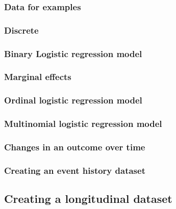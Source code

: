 \documentclass[
  letterpaper,
  DIV=11,
  numbers=noendperiod]{scrreprt}
\begin{document}
\hypertarget{data-for-examples}{%
\subsubsection{Data for examples}\label{data-for-examples}}

\hypertarget{discrete}{%
\subsubsection{Discrete}\label{discrete}}

\hypertarget{binary-logistic-regression-model}{%
\subsubsection{Binary Logistic regression
model}\label{binary-logistic-regression-model}}

\hypertarget{marginal-effects}{%
\subsubsection{Marginal effects}\label{marginal-effects}}

\hypertarget{ordinal-logistic-regression-model}{%
\subsubsection{Ordinal logistic regression
model}\label{ordinal-logistic-regression-model}}

\hypertarget{multinomial-logistic-regression-model}{%
\subsubsection{Multinomial logistic regression
model}\label{multinomial-logistic-regression-model}}

\hypertarget{changes-in-an-outcome-over-time}{%
\subsubsection{Changes in an outcome over
time}\label{changes-in-an-outcome-over-time}}

\hypertarget{creating-an-event-history-dataset}{%
\subsubsection{Creating an event history
dataset}\label{creating-an-event-history-dataset}}

\hypertarget{creating-a-longitudinal-dataset}{%
\subsection{Creating a longitudinal
dataset}\label{creating-a-longitudinal-dataset}}
\end{document}
